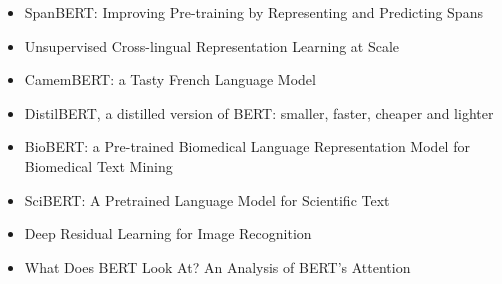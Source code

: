 \begin{itemize}
    \item {SpanBERT: Improving Pre-training by Representing and Predicting Spans} \cite{joshi2020spanbert}
    \item {Unsupervised Cross-lingual Representation Learning at Scale} \cite{conneau2019unsupervised}
    \item {CamemBERT: a Tasty French Language Model} \cite{martin2019camembert}
    \item {DistilBERT, a distilled version of BERT: smaller, faster, cheaper and lighter} \cite{sanh2019distilbert}
    \item {BioBERT: a Pre-trained Biomedical Language Representation Model for Biomedical Text Mining} \cite{lee2020biobert}
    \item {SciBERT: A Pretrained Language Model for Scientific Text} \cite{beltagy2019scibert}
    \item {Deep Residual Learning for Image Recognition} \cite{he2016deep}
    \item {What Does BERT Look At? An Analysis of BERT's Attention} \cite{clark2019does}
\end{itemize}